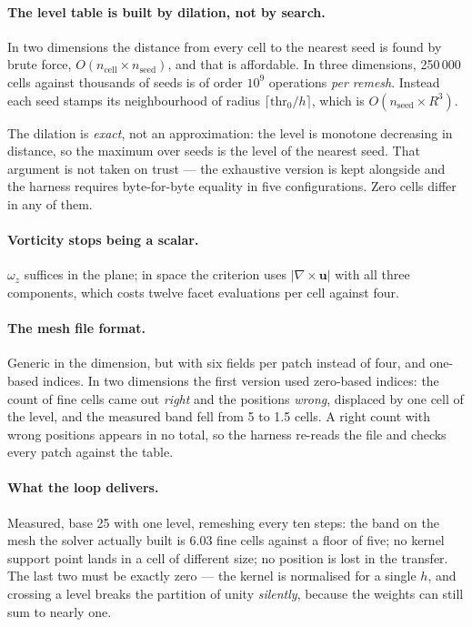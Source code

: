 \paragraph{The level table is built by dilation, not by search.}
In two dimensions the distance from every cell to the nearest seed is found by
brute force, $O(n_{\text{cell}} \times n_{\text{seed}})$, and that is affordable.
In three dimensions, 250\,000 cells against thousands of seeds is of order
$10^9$ operations \emph{per remesh}. Instead each seed stamps its neighbourhood
of radius $\lceil \mathrm{thr}_0/h \rceil$, which is
$O(n_{\text{seed}} \times R^3)$.

The dilation is \emph{exact}, not an approximation: the level is monotone
decreasing in distance, so the maximum over seeds is the level of the nearest
seed. That argument is not taken on trust --- the exhaustive version is kept
alongside and the harness requires byte-for-byte equality in five
configurations. Zero cells differ in any of them.

\paragraph{Vorticity stops being a scalar.}
$\omega_z$ suffices in the plane; in space the criterion uses
$|\nabla \times \mathbf{u}|$ with all three components, which costs twelve facet
evaluations per cell against four.

\paragraph{The mesh file format.}
Generic in the dimension, but with six fields per patch instead of four, and
one-based indices. In two dimensions the first version used zero-based indices:
the count of fine cells came out \emph{right} and the positions \emph{wrong},
displaced by one cell of the level, and the measured band fell from 5 to 1.5
cells. A right count with wrong positions appears in no total, so the harness
re-reads the file and checks every patch against the table.

\paragraph{What the loop delivers.}
Measured, base 25 with one level, remeshing every ten steps: the band on the
mesh the solver actually built is 6.03 fine cells against a floor of five; no
kernel support point lands in a cell of different size; no position is lost in
the transfer. The last two must be exactly zero --- the kernel is normalised for
a single $h$, and crossing a level breaks the partition of unity \emph{silently},
because the weights can still sum to nearly one.
